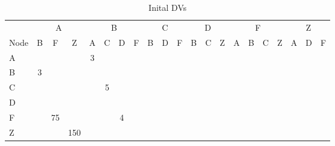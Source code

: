 \documentclass{article}
\begin{document}
\begin{table}[htbp]
  \centering
  \caption{Inital DVs}
  \begin{tabular}{l|ccc|cccc|ccc|ccc|cccc|ccc}
    \toprule
    & \multicolumn{3}{c|}{A}
    & \multicolumn{4}{c|}{B}
    & \multicolumn{3}{c|}{C}
    & \multicolumn{3}{c|}{D}
    & \multicolumn{4}{c|}{F}
    & \multicolumn{3}{c}{Z}
    \\ 
    Node  & B & F & Z & A& C & D & F & B & D & F & B & C & Z &A&B&C&Z&A&D&F \\
    \midrule 
    A &   & & & 3 
    \\
    B &  3 & 
    \\
    C & & & & & 5 
    \\
    D &
    \\
    F &   & 75 & & & & 4 
    \\
    Z &   & & 150 
    \\
    \bottomrule 
  \end{tabular}
\end{table}
\end{document}
